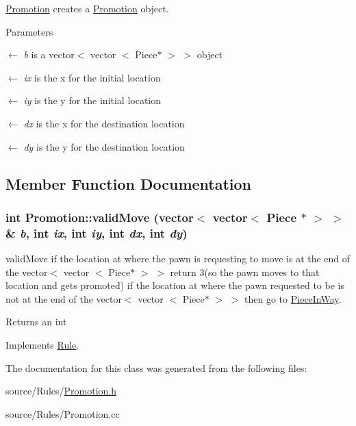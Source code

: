\hyperlink{classPromotion}{Promotion} creates a \hyperlink{classPromotion}{Promotion} object. 
\begin{DoxyParams}{Parameters}
\item[\mbox{$\leftarrow$} {\em b}]is a vector$<$ vector $<$ Piece$\ast$ $>$ $>$ object \item[\mbox{$\leftarrow$} {\em ix}]is the x for the initial location \item[\mbox{$\leftarrow$} {\em iy}]is the y for the initial location \item[\mbox{$\leftarrow$} {\em dx}]is the x for the destination location \item[\mbox{$\leftarrow$} {\em dy}]is the y for the destination location \end{DoxyParams}


\subsection{Member Function Documentation}
\hypertarget{classPromotion_abbf445a4b494712e0b8d8b6b3e69e0cf}{
\subsubsection[{validMove}]{\setlength{\rightskip}{0pt plus 5cm}int Promotion::validMove (vector$<$ vector$<$ {\bf Piece} $\ast$ $>$ $>$ \& {\em b}, \/  int {\em ix}, \/  int {\em iy}, \/  int {\em dx}, \/  int {\em dy})}}
\label{classPromotion_abbf445a4b494712e0b8d8b6b3e69e0cf}


validMove if the location at where the pawn is requesting to move is at the end of the vector$<$ vector $<$ Piece$\ast$ $>$ $>$ return 3(so the pawn moves to that location and gets promoted) if the location at where the pawn requested to be is not at the end of the vector$<$ vector $<$ Piece$\ast$ $>$ $>$ then go to \hyperlink{classPieceInWay}{PieceInWay}. \begin{DoxyReturn}{Returns}
an int 
\end{DoxyReturn}


Implements \hyperlink{classRule}{Rule}.

The documentation for this class was generated from the following files:\begin{DoxyCompactItemize}
\item 
source/Rules/\hyperlink{Promotion_8h}{Promotion.h}\item 
source/Rules/Promotion.cc\end{DoxyCompactItemize}
